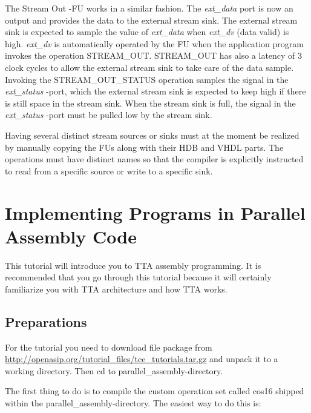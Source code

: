 \documentclass[twoside]{tceusermanual}
\begin{document}
The Stream Out -FU works in a similar fashion. The \textit{ext\_data} port is now 
an output and provides the data to the external stream sink. The external stream
sink is expected to sample the value of \textit{ext\_data} when \textit{ext\_dv}
(data valid) is high. \textit{ext\_dv} is automatically operated by the FU when
the application program invokes the operation STREAM\_OUT. STREAM\_OUT has also
a latency of 3 clock cycles to allow the external stream sink to take care of the
data sample. Invoking the STREAM\_OUT\_STATUS operation samples the signal in
the \textit{ext\_status} -port, which the external stream sink is expected to keep
high if there is still space in the stream sink. When the stream sink is full, the
signal in the \textit{ext\_status} -port must be pulled low by the stream sink.

Having several distinct stream sources or sinks must at the moment be realized
by manually copying the FUs along with their HDB and VHDL parts. The operations
must have distinct names so that the compiler is explicitly instructed to read
from a specific source or write to a specific sink.

\section{Implementing Programs in Parallel Assembly Code}
\label{section:parallelAssemblyCoding}

This tutorial will introduce you to TTA assembly programming. It is
recommended that you go through this tutorial because it will certainly
familiarize you with TTA architecture and how TTA works.

\subsection{Preparations}

For the tutorial you need to download file package from
\url{http://openasip.org/tutorial_files/tce_tutorials.tar.gz} and unpack it
to a working directory. Then cd to parallel\_assembly-directory.

The first thing to do is to compile the custom operation set called cos16 shipped
within the parallel\_assembly-directory. The easiest way to do this is:

\end{document}
